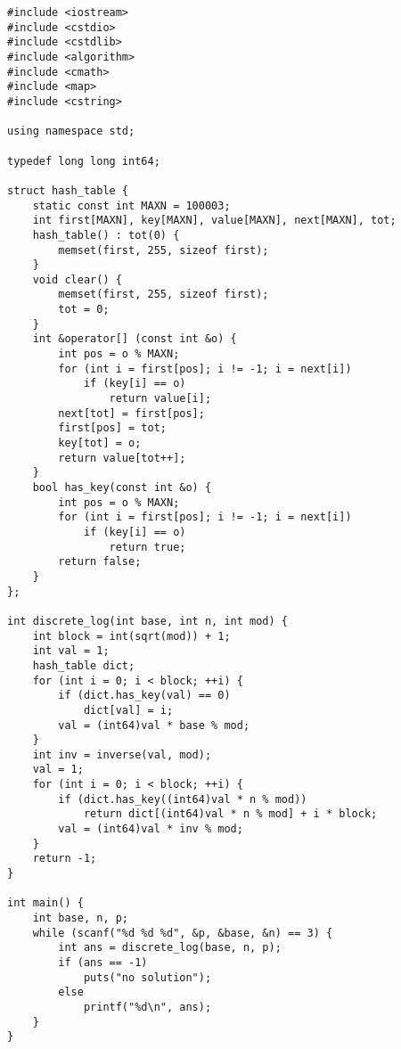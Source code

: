 \begin{lstlisting}
#include <iostream>
#include <cstdio>
#include <cstdlib>
#include <algorithm>
#include <cmath>
#include <map>
#include <cstring>

using namespace std;

typedef long long int64;

struct hash_table {
	static const int MAXN = 100003;
	int first[MAXN], key[MAXN], value[MAXN], next[MAXN], tot;
	hash_table() : tot(0) {
		memset(first, 255, sizeof first);
	}
	void clear() {
		memset(first, 255, sizeof first);
		tot = 0;
	}
	int &operator[] (const int &o) {
		int pos = o % MAXN;
		for (int i = first[pos]; i != -1; i = next[i])
			if (key[i] == o)
				return value[i];
		next[tot] = first[pos];
		first[pos] = tot;
		key[tot] = o;
		return value[tot++];
	}
	bool has_key(const int &o) {
		int pos = o % MAXN;
		for (int i = first[pos]; i != -1; i = next[i])
			if (key[i] == o)
				return true;
		return false;
	}
};

int discrete_log(int base, int n, int mod) {
	int block = int(sqrt(mod)) + 1;
	int val = 1;
	hash_table dict;
	for (int i = 0; i < block; ++i) {
		if (dict.has_key(val) == 0)
			dict[val] = i;
		val = (int64)val * base % mod;
	}
	int inv = inverse(val, mod);
	val = 1;
	for (int i = 0; i < block; ++i) {
		if (dict.has_key((int64)val * n % mod))
			return dict[(int64)val * n % mod] + i * block;
		val = (int64)val * inv % mod;
	}
	return -1;
}

int main() {
	int base, n, p;
	while (scanf("%d %d %d", &p, &base, &n) == 3) {
		int ans = discrete_log(base, n, p);
		if (ans == -1)
			puts("no solution");
		else
			printf("%d\n", ans);
	}
}
\end{lstlisting}
